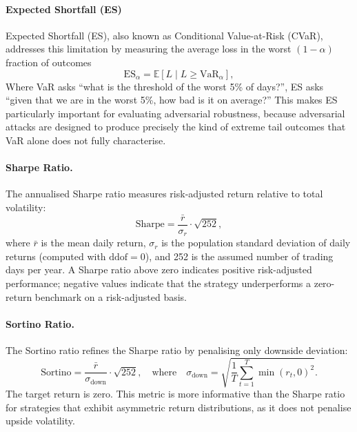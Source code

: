\paragraph{Expected Shortfall (ES)}
Expected Shortfall (ES), also known as Conditional Value-at-Risk (CVaR), addresses this limitation by measuring the average loss in the worst $(1-\alpha)$ fraction of outcomes
\begin{equation}
\mathrm{ES}_\alpha = \mathbb{E} \left[ L \mid L \geq \mathrm{VaR}_\alpha \right],
\end{equation}
Where VaR asks “what is the threshold of the worst 5\% of days?”, ES asks “given that we are in the worst 5\%, how bad is it on average?” This makes ES particularly important for evaluating adversarial robustness, because adversarial attacks are designed to produce precisely the kind of extreme tail outcomes that VaR alone does not fully characterise.

\paragraph{Sharpe Ratio.}
The annualised Sharpe ratio measures risk-adjusted return relative to total
volatility:
\begin{equation}
\text{Sharpe} = \frac{\bar{r}}{\sigma_r} \cdot \sqrt{252},
\end{equation}
where $\bar{r}$ is the mean daily return, $\sigma_r$ is the population standard
deviation of daily returns (computed with $\text{ddof}=0$), and 252 is the
assumed number of trading days per year. A Sharpe ratio above zero indicates
positive risk-adjusted performance; negative values indicate that the strategy
underperforms a zero-return benchmark on a risk-adjusted basis.

\paragraph{Sortino Ratio.}
The Sortino ratio refines the Sharpe ratio by penalising only downside
deviation:
\begin{equation}
\text{Sortino} = \frac{\bar{r}}{\sigma_{\text{down}}} \cdot \sqrt{252},
\quad \text{where} \quad
\sigma_{\text{down}} = \sqrt{\frac{1}{T} \sum_{t=1}^{T} \min(r_t, 0)^2}.
\end{equation}
The target return is zero. This metric is more informative than the Sharpe ratio
for strategies that exhibit asymmetric return distributions, as it does not
penalise upside volatility.

